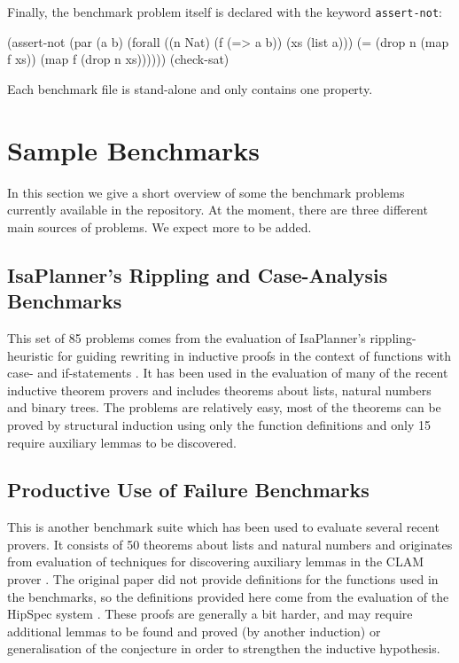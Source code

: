 \documentclass{llncs}
\begin{document}
\noindent
Finally, the benchmark problem itself is declared with the keyword \texttt{assert-not}:

\begin{code}
(assert-not
  (par (a b)
    (forall ((n Nat) (f (=> a b)) (xs (list a)))
      (= (drop n (map f xs)) (map f (drop n xs))))))
(check-sat)
\end{code}
Each benchmark file is stand-alone and only contains one property.

\section{Sample Benchmarks}
In this section we give a short overview of some the benchmark problems currently available in the repository. At the moment, there are three different main sources of problems. We expect more to be added.

\subsection{IsaPlanner's Rippling and Case-Analysis Benchmarks}
\label{sec:isap}
This set of 85 problems comes from the evaluation of IsaPlanner's rippling-heuristic for guiding rewriting in inductive proofs in the context of functions with case- and if-statements \cite{IsaPcase}. It has been used in the evaluation of many of the recent inductive theorem provers and includes theorems about lists, natural numbers and binary trees. The problems are relatively easy, most of the theorems can be proved by structural induction using only the function definitions and only 15 require auxiliary lemmas to be discovered.

\subsection{Productive Use of Failure Benchmarks}
This is another benchmark suite which has been used to evaluate several recent provers. It consists of 50 theorems about lists and natural numbers and originates from evaluation of techniques for discovering auxiliary lemmas in the CLAM prover \cite{productiveuse}. The original paper did not provide definitions for the functions used in the benchmarks, so the definitions provided here come from the evaluation of the HipSpec system \cite{hipspecCADE}. These proofs are generally a bit harder, and may require additional lemmas to be found and proved (by another induction) or generalisation of the conjecture in order to strengthen the inductive hypothesis.
\end{document}
